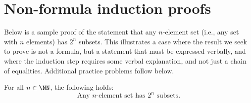 \section{Non-formula induction proofs}
\label{sec:Induction:NonFormulaProofs}



Below is a sample proof of the statement that any $n$-element set (i.e.,
any set with $n$ elements) has $2^n$ subsets. 
This illustrates a case where the result we seek to prove is not a
formula, but a statement that must be expressed verbally, and where the
induction step requires some verbal explanation, and not just a chain of
equalities.  Additional practice  problems follow below.


\begin{prop}{}
For all $n\in\NN$, the following holds:
\[
{\text{Any $n$-element set has $2^n$ subsets.}}
\tag{$P(n)$}
\]
\end{prop}
